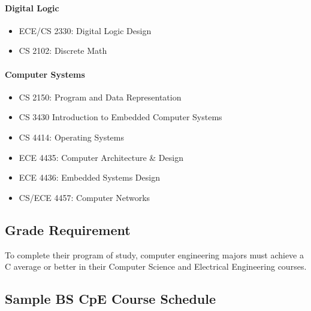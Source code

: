 \documentclass[10pt,letter,twocolumn]{book}
\newenvironment{itemlist}{
\begin{itemize}
\setlength{\itemsep}{0pt}
\setlength{\parskip}{0pt}}
{\end{itemize}}
\begin{document}
\paragraph{Digital Logic}
\begin{itemlist}
\item ECE/CS 2330: Digital Logic Design
\item CS 2102: Discrete Math
\end{itemlist}

\paragraph{Computer Systems}
\begin{itemlist}
\item CS 2150: Program and Data Representation
\item CS 3430 Introduction to Embedded Computer Systems
\item CS 4414: Operating Systems
\item ECE 4435: Computer Architecture \& Design
\item ECE 4436: Embedded Systems Design
\item CS/ECE 4457: Computer Networks
\end{itemlist}


\subsection{Grade Requirement}
To complete their program of study, computer engineering majors must
achieve a C average or better in their Computer Science and Electrical
Engineering courses.



\subsection{Sample BS CpE Course Schedule}
\end{document}
